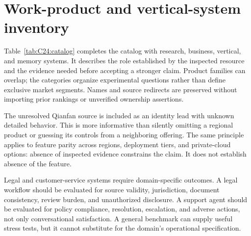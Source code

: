 \section{Work-product and vertical-system inventory}\label{sec:C24:catalog}
Table~\ref{tab:C24:catalog} completes the catalog with research, business, vertical, and memory systems. It describes the role established by the inspected resource and the evidence needed before accepting a stronger claim. Product families can overlap; the categories organize experimental questions rather than define exclusive market segments. Names and source redirects are preserved without importing prior rankings or unverified ownership assertions.


The unresolved Qianfan source is included as an identity lead with unknown detailed behavior. This is more informative than silently omitting a regional product or guessing its controls from a neighboring offering. The same principle applies to feature parity across regions, deployment tiers, and private-cloud options: absence of inspected evidence constrains the claim. It does not establish absence of the feature.

Legal and customer-service systems require domain-specific outcomes. A legal workflow should be evaluated for source validity, jurisdiction, document consistency, review burden, and unauthorized disclosure. A support agent should be evaluated for policy compliance, resolution, escalation, and adverse actions, not only conversational satisfaction. A general benchmark can supply useful stress tests, but it cannot substitute for the domain's operational specification.

